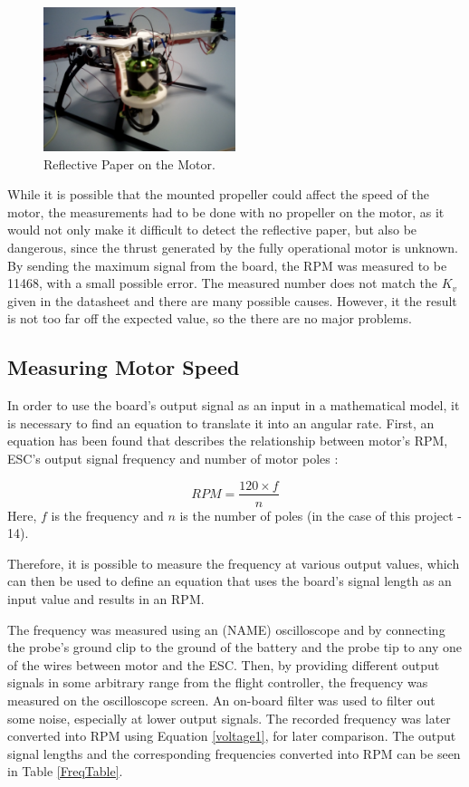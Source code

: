 \begin{figure}[H]
  \centering
    \includegraphics[width=0.5\textwidth]{images/tachometer.jpg}
	\caption{Reflective Paper on the Motor.}
	\label{tachometer}
\end{figure}

While it is possible that the mounted propeller could affect the speed of the motor, the measurements had to be done with no propeller on the motor, as it would not only make it difficult to detect the reflective paper, but also be dangerous, since the thrust generated by the fully operational motor is unknown.
By sending the maximum signal from the board, the RPM was measured to be 11468, with a small possible error. The measured number does not match the $K_v$ given in the datasheet and there are many possible causes. However, it the result is not too far off the expected value, so the there are no major problems.

\subsection{Measuring Motor Speed}
In order to use the board's output signal as an input in a mathematical model, it is necessary to find an equation to translate it into an angular rate.
First, an equation has been found that describes the relationship between motor's RPM, ESC's output signal frequency and number of motor poles \cite{RPMEq}:

\begin{equation}
\label{voltage1}
	RPM = \frac{120\times f}{n}
\end{equation}
Here, $f$ is the frequency and $n$ is the number of poles (in the case of this project - 14).

Therefore, it is possible to measure the frequency at various output values, which can then be used to define an equation that uses the board's signal length as an input value and results in an RPM.

The frequency was measured using an (NAME) oscilloscope and by connecting the probe's ground clip to the ground of the battery and the probe tip to any one of the wires between motor and the ESC. Then, by providing different output signals in some arbitrary range from the flight controller, the frequency was measured on the oscilloscope screen. An on-board filter was used to filter out some noise, especially at lower output signals. The recorded frequency was later converted into RPM using Equation \ref{voltage1}, for later comparison. The output signal lengths and the corresponding frequencies converted into RPM can be seen in Table \ref{FreqTable}.

